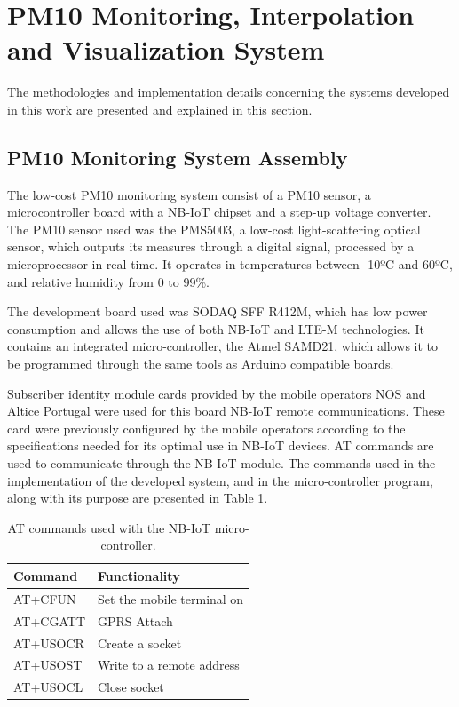 \section{PM10 Monitoring, Interpolation and Visualization System}
\label{sec: imple}

The methodologies and implementation details concerning the systems developed in this work are presented and explained in this section.

\subsection{PM10 Monitoring System Assembly}

The low-cost PM10 monitoring system consist of a PM10 sensor, a microcontroller board with a NB-IoT chipset and a step-up voltage converter.
The PM10 sensor used was the PMS5003, a low-cost light-scattering optical sensor, which outputs its measures through a digital signal, processed by a microprocessor in real-time. It operates in temperatures between -10ºC and 60ºC, and relative humidity from 0 to 99\%.

The development board used was SODAQ SFF R412M, which has low power consumption and allows the use of both NB-IoT and LTE-M technologies. It contains an integrated micro-controller, the Atmel SAMD21, which allows it to be programmed through the same
tools as Arduino compatible boards.

Subscriber identity module cards provided by the mobile operators NOS and Altice Portugal were used for this board NB-IoT remote communications. These card were previously configured by the mobile operators according to the specifications needed for its optimal use in NB-IoT devices. AT commands are used to communicate through the NB-IoT module. The commands used in the implementation of the developed system, and in the micro-controller program, along with its purpose are presented in Table \ref{table:atCommands}.

\begin{table}[ht]
\footnotesize
\centering
\caption{AT commands used with the NB-IoT micro-controller.}
\label{table:atCommands}
\begin{tabular}{l>{\raggedright\arraybackslash}p{}} %
\toprule
Command&Functionality\\
\midrule
AT+CFUN&Set the mobile terminal on\\
AT+CGATT&GPRS Attach\\
AT+USOCR&Create a socket\\
AT+USOST&Write to a remote address\\
AT+USOCL&Close socket\\
\bottomrule
\end{tabular}
\end{table}

